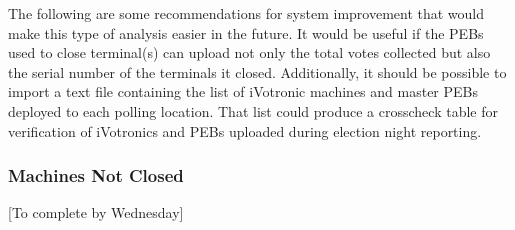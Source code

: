The following are some recommendations for system improvement that would make this type of analysis easier in the future.  It would be useful if the PEBs used to close terminal(s) can upload not only the total votes collected but also the serial number of the terminals it closed. Additionally, it should be possible to import a text file containing the list of iVotronic machines and master PEBs deployed to each polling location.  That list could produce a crosscheck table for verification of iVotronics and PEBs uploaded during election night reporting.

\subsubsection{Machines Not Closed}
[To complete by Wednesday]
